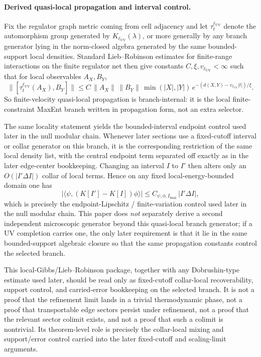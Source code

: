 \documentclass[11pt]{article}
\begin{document}
\paragraph{Derived quasi-local propagation and interval control.}
Fix the regulator graph metric coming from cell adjacency and let \(\tau_t^{\ell_{\mathrm{UV}}}\) denote the automorphism group generated by \(K_{\ell_{\mathrm{UV}}}(\lambda)\), or more generally by any branch generator lying in the norm-closed algebra generated by the same bounded-support local densities. Standard Lieb--Robinson estimates for finite-range interactions on the finite regulator net then give constants \(C,\xi,v_{\ell_{\mathrm{UV}}}<\infty\) such that for local observables \(A_X,B_Y\), \cite{liebRobinson72}
\[
\bigl\|[\tau_t^{\ell_{\mathrm{UV}}}(A_X),B_Y]\bigr\|
\le
C\,\|A_X\|\,\|B_Y\|\,\min(|X|,|Y|)\,
e^{-(d(X,Y)-v_{\ell_{\mathrm{UV}}}|t|)/\xi}.
\]
So finite-velocity quasi-local propagation is branch-internal: it is the local finite-constraint MaxEnt branch written in propagation form, not an extra selector.

The same locality statement yields the bounded-interval endpoint control used later in the null modular chain. Whenever later sections use a fixed-cutoff interval or collar generator on this branch, it is the corresponding restriction of the same local density list, with the central endpoint term separated off exactly as in the later edge-center bookkeeping. Changing an interval \(I\) to \(I'\) then alters only an \(O(|I'\Delta I|)\) collar of local terms. Hence on any fixed local-energy-bounded domain one has
\[
\left|\langle\psi,(K[I']-K[I])\phi\rangle\right|
\le
C_{\psi,\phi,I_{\max}}\,|I'\Delta I|,
\]
which is precisely the endpoint-Lipschitz / finite-variation control used later in the null modular chain. This paper does \emph{not} separately derive a second independent microscopic generator beyond this quasi-local branch generator; if a UV completion carries one, the only later requirement is that it lie in the same bounded-support algebraic closure so that the same propagation constants control the selected branch.

This local-Gibbs/Lieb--Robinson package, together with any Dobrushin-type estimate used later, should be read only as fixed-cutoff collar-local recoverability, support control, and carried-error bookkeeping on the selected branch. It is not a proof that the refinement limit lands in a trivial thermodynamic phase, not a proof that transportable edge sectors persist under refinement, not a proof that the relevant sector colimit exists, and not a proof that such a colimit is nontrivial. Its theorem-level role is precisely the collar-local mixing and support/error control carried into the later fixed-cutoff and scaling-limit arguments.
\end{document}
